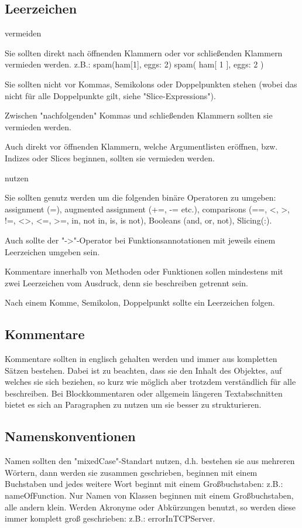 \subsection{Leerzeichen}
\begin{itemize}
vermeiden
\begin{itemize}
Sie sollten direkt nach öffnenden Klammern oder vor schließenden Klammern vermieden werden.
z.B.: spam(ham[1], {eggs: 2})
	  spam( ham[ 1 ], { eggs: 2 } )
	  
Sie sollten nicht vor Kommas, Semikolons oder Doppelpunkten stehen (wobei das nicht für alle Doppelpunkte gilt, siehe "Slice-Expressions").

Zwischen "nachfolgenden" Kommas und schließenden Klammern sollten sie vermieden werden.

Auch direkt vor öffnenden Klammern, welche Argumentlisten eröffnen, bzw. Indizes oder Slices beginnen, sollten sie vermieden werden.
\end{itemize}
nutzen
\begin{itemize}
Sie sollten genutz werden um die folgenden binäre Operatoren zu umgeben: assignment (=), augmented assignment (+=, -= etc.), comparisons (==, <, >, !=, <>, <=, >=, in, not in, is, is not), Booleans (and, or, not), Slicing(:).

Auch sollte der "->"-Operator bei Funktionsannotationen mit jeweils einem Leerzeichen umgeben sein.

Kommentare innerhalb von Methoden oder Funktionen sollen mindestens mit zwei Leerzeichen vom Ausdruck, denn sie beschreiben getrennt sein.

Nach einem Komme, Semikolon, Doppelpunkt sollte ein Leerzeichen folgen.
\end{itemize}
\end{itemize}

\subsection{Kommentare}
Kommentare sollten in englisch gehalten werden und immer aus kompletten Sätzen bestehen. Dabei ist zu beachten, dass sie den Inhalt des Objektes, auf welches sie sich beziehen, so kurz wie möglich aber trotzdem verständlich für alle beschreiben. Bei Blockkommentaren oder allgemein längeren Textabschnitten bietet es sich an Paragraphen zu nutzen um sie besser zu strukturieren.

\subsection{Namenskonventionen}
Namen sollten den "mixedCase"-Standart nutzen, d.h. bestehen sie aus mehreren Wörtern, dann werden sie zusammen geschrieben, beginnen mit einem Buchstaben und jedes weitere Wort beginnt mit einem Großbuchstaben: z.B.: nameOfFunction. Nur Namen von Klassen beginnen mit einem Großbuchstaben, alle andern klein. Werden Akronyme oder Abkürzungen benutzt, so werden diese immer komplett groß geschrieben: z.B.: errorInTCPServer.